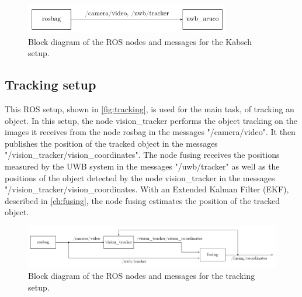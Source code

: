 \begin{figure}[h]\centering
	\includegraphics[width=0.8\textwidth]{figures/blockdiagram_kabsch}
	\caption{Block diagram of the \ac{ROS} nodes and messages for the Kabsch setup.}\label{fig:kabsch}
\end{figure}

\subsection{Tracking setup}\label{subsec:tracking}
This \ac{ROS} setup, shown in \autoref{fig:tracking}, is used for the main task, of tracking an object. In this setup, the node vision\_tracker performs the object tracking on the images it receives from the node rosbag in the messages "/camera/video". It then publishes the position of the tracked object in the messages "/vision\_tracker/vision\_coordinates". The node fusing receives the positions measured by the \ac{UWB} system in the messages "/uwb/tracker" as well as the positions of the object detected by the node vision\_tracker in the messages "/vision\_tracker/vision\_coordinates. With an Extended Kalman Filter (EKF), described in \autoref{ch:fusing}, the node fusing estimates the position of the tracked object.

\begin{figure}[h]\centering
	\includegraphics[width=1.0\textwidth]{figures/blockdiagram_tracking}
	\caption{Block diagram of the \ac{ROS} nodes and messages for the tracking setup.}\label{fig:tracking}
\end{figure}
